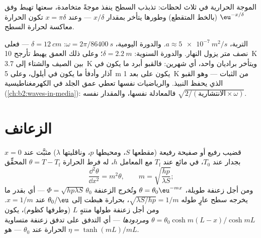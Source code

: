 \begin{omfigure}

{\small الموجة الحرارية في ثلاث لحظات: تذبذب السطح
ينفذ موجةً متخامدة، سعتها تهبط وفق $\eu^{-x/\delta}$
(بالخط المتقطع) وطورها يتأخر بمقدار $x/\delta$ --- وعند $x = \pi\delta$ تكون
الحرارة معاكسة لحرارة السطح.}
\end{omfigure}

\begin{example}\label{ex:b2:heat-conduction:soil}
التربة، $a \approx \qty{5e-7}{m^2/s}$. والدورة اليومية، $\omega = 2\pi/\qty{86400}{s}$:
$\delta = \qty{12}{cm}$ --- فعلى نصف متر يزول النهار. والدورة السنوية:
$\delta = \qty{2.2}{m}$؛ وعلى ذلك العمق يهبط تأرجح \qty{10}{K} بين الصيف والشتاء
إلى \qty{3.7}{K} ويتأخر براديان واحد، أي شهرين: فالقبو
أبرد ما يكون في آذار وأدفأ ما يكون في أيلول، وعلى \qty{5}{m} يكون على بعد
\qty{1}{K} من الثبات --- وهو القبو الذي يحفظ النبيذ. والرياضيات
نفسها تعطي عمق الجلد في الكهرمغناطيسية
(\cref{ch:b2:waves-in-media}): فالمعادلة نفسها، والمقدار نفسه $\sqrt{2/(\text{الانتشارية}
\times\omega)}$.
\end{example}

\section{الزعانف}

\begin{proposition}\label{prop:b2:heat-conduction:fin}
قضيب رفيع أو صفيحة رفيعة (مقطعها $S$، ومحيطها $p$، وناقليتها $\lambda$)
مثبَّت عند $x = 0$ بجدار عند $T_0$، في مائع عند $T_{\text{f}}$ مع
المعامل $h$، له فرط الحرارة $\theta = T - T_{\text{f}}$
المحقِّق
\[
\frac{\dd^2\theta}{\dd x^2} = m^2\theta, \qquad m = \sqrt{\frac{hp}{\lambda S}} ;
\]
ومن أجل زعنفة طويلة، $\theta = \theta_0\eu^{-mx}$ وتُخرج الزعنفة $\Phi =
\sqrt{hp\lambda S}\,\theta_0$ --- أي بقدر ما يخرجه سطح عارٍ طوله $\sqrt{\lambda
S/hp} = 1/m$، بحرارة هبطت إلى $\theta_0/\eu$ عند
$x = 1/m$. ومن أجل زعنفة طولها منتهٍ $L$ (وطرفها كظوم)، يكون $\theta =
\theta_0\cosh m(L-x)/\cosh mL$ و\emph{مردودها} --- أي التدفق على تدفق زعنفة متساوية الحرارة عند $\theta_0$ ---
هو $\eta = \tanh(mL)/mL$.
\end{proposition}

